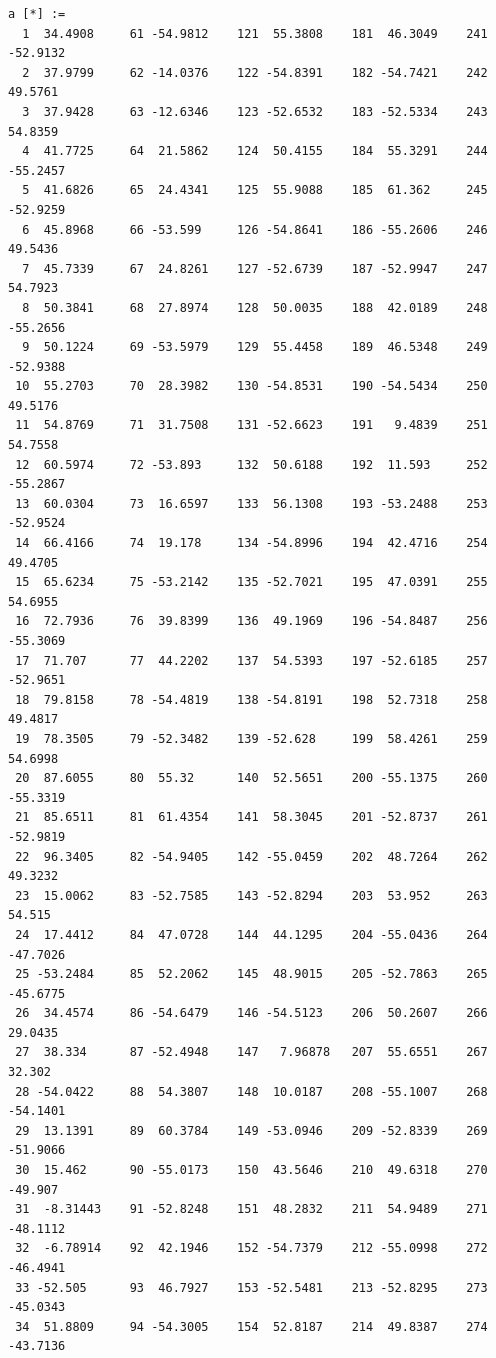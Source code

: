 \documentclass{article}
\begin{document}
\begin{verbatim}
a [*] :=
  1  34.4908     61 -54.9812    121  55.3808    181  46.3049    241 -52.9132
  2  37.9799     62 -14.0376    122 -54.8391    182 -54.7421    242  49.5761
  3  37.9428     63 -12.6346    123 -52.6532    183 -52.5334    243  54.8359
  4  41.7725     64  21.5862    124  50.4155    184  55.3291    244 -55.2457
  5  41.6826     65  24.4341    125  55.9088    185  61.362     245 -52.9259
  6  45.8968     66 -53.599     126 -54.8641    186 -55.2606    246  49.5436
  7  45.7339     67  24.8261    127 -52.6739    187 -52.9947    247  54.7923
  8  50.3841     68  27.8974    128  50.0035    188  42.0189    248 -55.2656
  9  50.1224     69 -53.5979    129  55.4458    189  46.5348    249 -52.9388
 10  55.2703     70  28.3982    130 -54.8531    190 -54.5434    250  49.5176
 11  54.8769     71  31.7508    131 -52.6623    191   9.4839    251  54.7558
 12  60.5974     72 -53.893     132  50.6188    192  11.593     252 -55.2867
 13  60.0304     73  16.6597    133  56.1308    193 -53.2488    253 -52.9524
 14  66.4166     74  19.178     134 -54.8996    194  42.4716    254  49.4705
 15  65.6234     75 -53.2142    135 -52.7021    195  47.0391    255  54.6955
 16  72.7936     76  39.8399    136  49.1969    196 -54.8487    256 -55.3069
 17  71.707      77  44.2202    137  54.5393    197 -52.6185    257 -52.9651
 18  79.8158     78 -54.4819    138 -54.8191    198  52.7318    258  49.4817
 19  78.3505     79 -52.3482    139 -52.628     199  58.4261    259  54.6998
 20  87.6055     80  55.32      140  52.5651    200 -55.1375    260 -55.3319
 21  85.6511     81  61.4354    141  58.3045    201 -52.8737    261 -52.9819
 22  96.3405     82 -54.9405    142 -55.0459    202  48.7264    262  49.3232
 23  15.0062     83 -52.7585    143 -52.8294    203  53.952     263  54.515
 24  17.4412     84  47.0728    144  44.1295    204 -55.0436    264 -47.7026
 25 -53.2484     85  52.2062    145  48.9015    205 -52.7863    265 -45.6775
 26  34.4574     86 -54.6479    146 -54.5123    206  50.2607    266  29.0435
 27  38.334      87 -52.4948    147   7.96878   207  55.6551    267  32.302
 28 -54.0422     88  54.3807    148  10.0187    208 -55.1007    268 -54.1401
 29  13.1391     89  60.3784    149 -53.0946    209 -52.8339    269 -51.9066
 30  15.462      90 -55.0173    150  43.5646    210  49.6318    270 -49.907
 31  -8.31443    91 -52.8248    151  48.2832    211  54.9489    271 -48.1112
 32  -6.78914    92  42.1946    152 -54.7379    212 -55.0998    272 -46.4941
 33 -52.505      93  46.7927    153 -52.5481    213 -52.8295    273 -45.0343
 34  51.8809     94 -54.3005    154  52.8187    214  49.8387    274 -43.7136

\end{verbatim}
\end{document}
